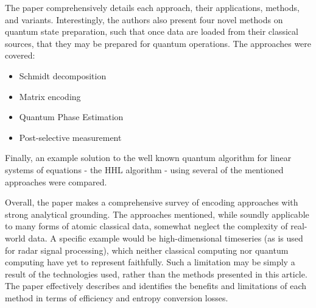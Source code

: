 The paper comprehensively details each approach, their applications, methods, and variants. Interestingly, the authors also present four novel methods on quantum state preparation, such that once data are loaded from their classical sources, that they may be prepared for quantum operations. The approaches were covered:

\begin{itemize}
    \item Schmidt decomposition
    \item Matrix encoding
    \item Quantum Phase Estimation
    \item Post-selective measurement
\end{itemize}

Finally, an example solution to the well known quantum algorithm for linear systems of equations - the HHL algorithm - using several of the mentioned approaches were compared.

Overall, the paper makes a comprehensive survey of encoding approaches with strong analytical grounding. The approaches mentioned, while soundly applicable to many forms of atomic classical data, somewhat neglect the complexity of real-world data. A specific example would be high-dimensional timeseries (as is used for radar signal processing), which neither classical computing nor quantum computing have yet to represent faithfully. Such a limitation may be simply a result of the technologies used, rather than the methods presented in this article. The paper effectively describes and identifies the benefits and limitations of each method in terms of efficiency and entropy conversion losses.



